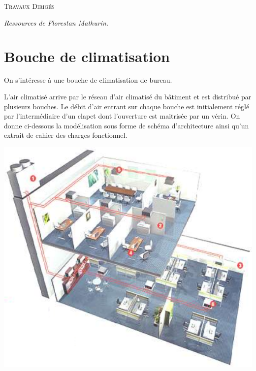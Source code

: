 \documentclass[10pt]{article}
\begin{document}

\begin{center}
\large{\textsc{Travaux Dirigés}}
\end{center}

\begin{flushright}
\textit{Ressources de Florestan Mathurin.}
\end{flushright}



\section*{Bouche de climatisation}

\begin{minipage}[c]{.5\linewidth}
On s’intéresse à une bouche de climatisation de bureau.   

L’air climatisé arrive par le réseau d’air climatisé du bâtiment et est distribué par plusieurs bouches. Le débit d’air entrant sur chaque bouche est initialement réglé par l’intermédiaire d’un clapet dont l’ouverture est maitrisée  par un vérin. On donne ci-dessous la modélisation sous forme de schéma d’architecture ainsi qu’un extrait de cahier des charges fonctionnel. 

\end{minipage} \hfill
\begin{minipage}[c]{.47\linewidth}
\begin{center}
\includegraphics[width=.95\textwidth]{images/img1}
\end{center}
\end{minipage}
\end{document}
